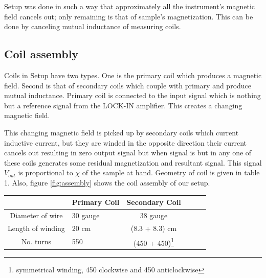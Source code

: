 Setup was done in such a way that approximately all the instrument's magnetic field cancels out; only remaining is that of sample’s magnetization.  This can be done by canceling mutual inductance of measuring coils. 
\subsection{Coil assembly}
Coils in Setup have two types. One is the primary coil which produces a magnetic field. Second is that of secondary coils which couple with primary and produce mutual inductance. Primary coil is connected to the input signal which is nothing but a reference signal from the LOCK-IN amplifier. This creates a changing magnetic field. 


This changing magnetic field is picked up by secondary coils which current inductive current, but they are winded in the opposite direction their current cancels out resulting in zero output signal but when signal is but in any one of these coils generates some residual magnetization and resultant signal. This signal $V_{out}$ is proportional to $\chi$ of the sample at hand. Geometry of coil is given in table 1. Also, figure \ref{fig:assembly} shows the coil assembly of our setup.

\noindent\setlength\tabcolsep{4pt}%
\begin{tabularx}{\linewidth}{|c|Y|c|Y|c|Y}
  \hline
  \hline
  & Primary Coil & Secondary Coil \\
  \hline
 Diameter of wire & 30 gauge & 38 gauge \\
 Length of winding & 20 cm & (8.3 + 8.3) cm \\
 No. turns & 550 & (450 + 450)\footnote{symmetrical winding, 450 clockwise and 450 anticlockwise}\\
 \hline
 \hline
\end{tabularx}
\label{geometry}
\vskip1cm

